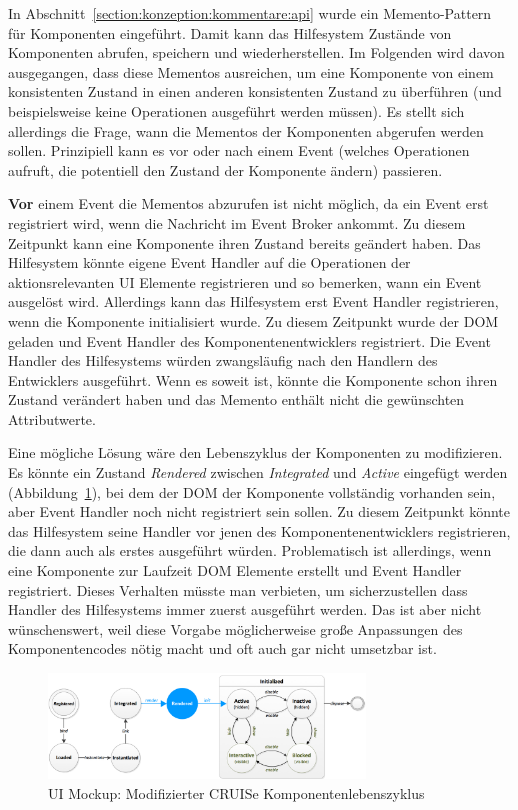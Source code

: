 \documentclass[
	headsepline,
	footsepline,
	fontsize=12pt,
	bibliography=totoc
]{scrbook}
\begin{document}
In Abschnitt~\ref{section:konzeption:kommentare:api} wurde ein Memento-Pattern für Komponenten eingeführt. Damit kann das Hilfesystem Zustände von Komponenten abrufen, speichern und wiederherstellen. Im Folgenden wird davon ausgegangen, dass diese Mementos ausreichen, um eine Komponente von einem konsistenten Zustand in einen anderen konsistenten Zustand zu überführen (und beispielsweise keine Operationen ausgeführt werden müssen). Es stellt sich allerdings die Frage, wann die Mementos der Komponenten abgerufen werden sollen. Prinzipiell kann es vor oder nach einem Event (welches Operationen aufruft, die potentiell den Zustand der Komponente ändern) passieren.


\textbf{Vor} einem Event die Mementos abzurufen ist nicht möglich, da ein Event erst registriert wird, wenn die Nachricht im Event Broker ankommt. Zu diesem Zeitpunkt kann eine Komponente ihren Zustand bereits geändert haben. Das Hilfesystem könnte eigene Event Handler auf die Operationen der aktionsrelevanten UI Elemente registrieren und so bemerken, wann ein Event ausgelöst wird. Allerdings kann das Hilfesystem erst Event Handler registrieren, wenn die Komponente initialisiert wurde. Zu diesem Zeitpunkt wurde der DOM geladen und Event Handler des Komponentenentwicklers registriert. Die Event Handler des Hilfesystems würden zwangsläufig nach den Handlern des Entwicklers ausgeführt. Wenn es soweit ist, könnte die Komponente schon ihren Zustand verändert haben und das Memento enthält nicht die gewünschten Attributwerte.

Eine mögliche Lösung wäre den Lebenszyklus der Komponenten zu modifizieren. Es könnte ein Zustand \emph{Rendered} zwischen \emph{Integrated} und \emph{Active} eingefügt werden (Abbildung~\ref{figure:cruise-lifecycle}), bei dem der DOM der Komponente vollständig vorhanden sein, aber Event Handler noch nicht registriert sein sollen. Zu diesem Zeitpunkt könnte das Hilfesystem seine Handler vor jenen des Komponentenentwicklers registrieren, die dann auch als erstes ausgeführt würden. Problematisch ist allerdings, wenn eine Komponente zur Laufzeit DOM Elemente erstellt und Event Handler registriert. Dieses Verhalten müsste man verbieten, um sicherzustellen dass Handler des Hilfesystems immer zuerst ausgeführt werden. Das ist aber nicht wünschenswert, weil diese Vorgabe möglicherweise große Anpassungen des Komponentencodes nötig macht und oft auch gar nicht umsetzbar ist.

\begin{figure}[htbp]
   \centering
   \includegraphics[width=0.75\textwidth]{images/konzeption-cruise-lifecycle.png}
   \caption{UI Mockup: Modifizierter CRUISe Komponentenlebenszyklus}
   \label{figure:cruise-lifecycle}
\end{figure}
\end{document}
